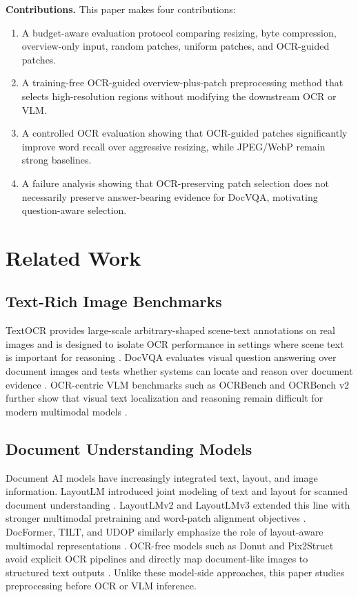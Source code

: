 \documentclass[conference]{IEEEtran}
\newcommand{\datasetocr}{TextOCR}
\newcommand{\datasetvlm}{DocVQA}
\begin{document}
\textbf{Contributions.} This paper makes four contributions:
\begin{enumerate}[leftmargin=*]
    \item A budget-aware evaluation protocol comparing resizing, byte compression, overview-only input, random patches, uniform patches, and OCR-guided patches.
    \item A training-free OCR-guided overview-plus-patch preprocessing method that selects high-resolution regions without modifying the downstream OCR or VLM.
    \item A controlled OCR evaluation showing that OCR-guided patches significantly improve word recall over aggressive resizing, while JPEG/WebP remain strong baselines.
    \item A failure analysis showing that OCR-preserving patch selection does not necessarily preserve answer-bearing evidence for DocVQA, motivating question-aware selection.
\end{enumerate}

\section{Related Work}
\subsection{Text-Rich Image Benchmarks}
\datasetocr{} provides large-scale arbitrary-shaped scene-text annotations on real images and is designed to isolate OCR performance in settings where scene text is important for reasoning \cite{textocr}. \datasetvlm{} evaluates visual question answering over document images and tests whether systems can locate and reason over document evidence \cite{docvqa}. OCR-centric VLM benchmarks such as OCRBench and OCRBench v2 further show that visual text localization and reasoning remain difficult for modern multimodal models \cite{ocrbenchv2}.

\subsection{Document Understanding Models}
Document AI models have increasingly integrated text, layout, and image information. LayoutLM introduced joint modeling of text and layout for scanned document understanding \cite{layoutlm}. LayoutLMv2 and LayoutLMv3 extended this line with stronger multimodal pretraining and word-patch alignment objectives \cite{layoutlmv2,layoutlmv3}. DocFormer, TILT, and UDOP similarly emphasize the role of layout-aware multimodal representations \cite{docformer,tilt,udop}. OCR-free models such as Donut and Pix2Struct avoid explicit OCR pipelines and directly map document-like images to structured text outputs \cite{donut,pix2struct}. Unlike these model-side approaches, this paper studies preprocessing before OCR or VLM inference.
\end{document}
